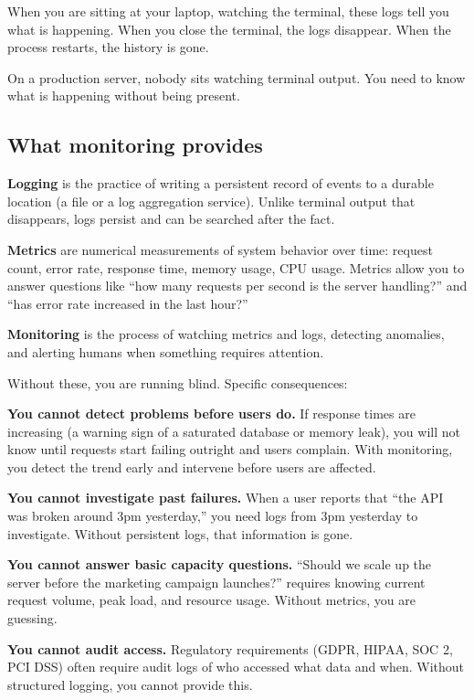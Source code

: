 \noindent{}When you are sitting at your laptop, watching the terminal, these logs tell you what is happening. When you close the terminal, the logs disappear. When the process restarts, the history is gone.

On a production server, nobody sits watching terminal output. You need to know what is happening without being present.

\subsection*{What monitoring provides}\label{11-reliability-security-gaps:what-monitoring-provides}

\textbf{Logging} is the practice of writing a persistent record of events to a durable location (a file or a log aggregation service). Unlike terminal output that disappears, logs persist and can be searched after the fact.

\textbf{Metrics} are numerical measurements of system behavior over time: request count, error rate, response time, memory usage, CPU usage. Metrics allow you to answer questions like ``how many requests per second is the server handling?'' and ``has error rate increased in the last hour?''

\textbf{Monitoring} is the process of watching metrics and logs, detecting anomalies, and alerting humans when something requires attention.

Without these, you are running blind. Specific consequences:

\textbf{You cannot detect problems before users do.} If response times are increasing (a warning sign of a saturated database or memory leak), you will not know until requests start failing outright and users complain. With monitoring, you detect the trend early and intervene before users are affected.

\textbf{You cannot investigate past failures.} When a user reports that ``the API was broken around 3pm yesterday,'' you need logs from 3pm yesterday to investigate. Without persistent logs, that information is gone.

\textbf{You cannot answer basic capacity questions.} ``Should we scale up the server before the marketing campaign launches?'' requires knowing current request volume, peak load, and resource usage. Without metrics, you are guessing.

\textbf{You cannot audit access.} Regulatory requirements (GDPR, HIPAA, SOC 2, PCI DSS) often require audit logs of who accessed what data and when. Without structured logging, you cannot provide this.

